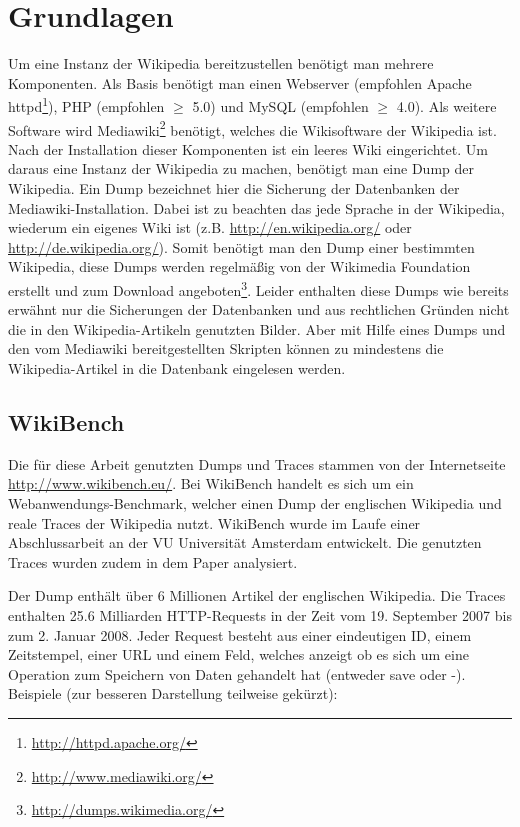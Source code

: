 \section{Grundlagen}
\label{sec:grundlagen}

Um eine Instanz der Wikipedia bereitzustellen benötigt man mehrere Komponenten. Als Basis benötigt man einen Webserver (empfohlen Apache httpd\footnote{\url{http://httpd.apache.org/}}), PHP (empfohlen $\geq$ 5.0) und MySQL (empfohlen $\geq$ 4.0). Als weitere Software wird Mediawiki\footnote{\url{http://www.mediawiki.org/}} benötigt, welches die Wikisoftware der Wikipedia ist. Nach der Installation dieser Komponenten ist ein leeres Wiki eingerichtet. Um daraus eine Instanz der Wikipedia zu machen, benötigt man eine Dump der Wikipedia. Ein Dump bezeichnet hier die Sicherung der Datenbanken der Mediawiki-Installation. Dabei ist zu beachten das jede Sprache in der Wikipedia, wiederum ein eigenes Wiki ist (z.B. \url{http://en.wikipedia.org/} oder \url{http://de.wikipedia.org/}). Somit benötigt man den Dump einer bestimmten Wikipedia, diese Dumps werden regelmäßig von der Wikimedia Foundation erstellt und zum Download angeboten\footnote{\url{http://dumps.wikimedia.org/}}. Leider enthalten diese Dumps wie bereits erwähnt nur die Sicherungen der Datenbanken und aus rechtlichen Gründen nicht die in den Wikipedia-Artikeln genutzten Bilder. Aber mit Hilfe eines Dumps und den vom Mediawiki bereitgestellten Skripten können zu mindestens die Wikipedia-Artikel in die Datenbank eingelesen werden.

\subsection{WikiBench}
\label{sec:wikibench}

Die für diese Arbeit genutzten Dumps und Traces stammen von der Internetseite \url{http://www.wikibench.eu/}. Bei WikiBench handelt es sich um ein Webanwendungs-Benchmark, welcher einen Dump der englischen Wikipedia und reale Traces der Wikipedia nutzt. WikiBench wurde im Laufe einer Abschlussarbeit \cite{wikibench} an der VU Universität Amsterdam entwickelt. Die genutzten Traces wurden zudem in dem Paper \cite{wikianal} analysiert.

Der Dump enthält über 6 Millionen Artikel der englischen Wikipedia. Die Traces enthalten 25.6 Milliarden HTTP-Requests in der Zeit vom 19. September 2007 bis zum 2. Januar 2008. Jeder Request besteht aus einer eindeutigen ID, einem Zeitstempel, einer URL und einem Feld, welches anzeigt ob es sich um eine Operation zum Speichern von Daten gehandelt hat (entweder \glqq{}save\grqq{} oder \glqq{}-\grqq{}). Beispiele (zur besseren Darstellung teilweise gekürzt):

